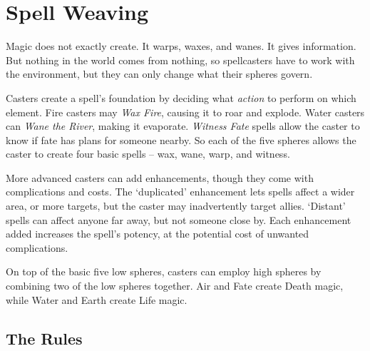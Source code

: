 \chapter{Spell Weaving}

Magic does not exactly create.
It warps, waxes, and wanes.
It gives information.
But nothing in the world comes from nothing, so spellcasters have to work with the environment, but they can only change what their spheres govern.

Casters create a spell's foundation by deciding what \emph{action} to perform on which element.
Fire casters may \textit{Wax Fire}, causing it to roar and explode.
Water casters can \textit{Wane the River}, making it evaporate.
\textit{Witness Fate} spells allow the caster to know if fate has plans for someone nearby.
So each of the five spheres allows the caster to create four basic spells -- wax, wane, warp, and witness.

More advanced casters can add enhancements, though they come with complications and costs.
The `duplicated' enhancement lets spells affect a wider area, or more targets, but the caster may inadvertently target allies.
`Distant' spells can affect anyone far away, but not someone close by.
Each enhancement added increases the spell's potency, at the potential cost of unwanted complications.

On top of the basic five low spheres, casters can employ high spheres by combining two of the low spheres together.
Air and Fate create Death magic, while Water and Earth create Life magic.

\section{The Rules}


